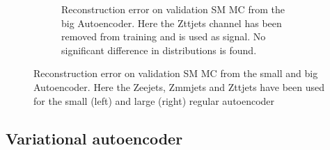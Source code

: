 \begin{figure}[H]
\begin{subfigure}{.45\textwidth}
        \caption{Reconstruction error on validation SM MC from the big Autoencoder. Here the Zttjets channel has been removed from training and 
        is used as signal. No significant difference in distributions is found. }
        \label{fig:ae_big_Zttjets}
    \end{subfigure}
    \hfill  
    \caption[AE | Channel removal, Zeejets, Zmmjets, Zttjets]{Reconstruction error on validation SM MC from the small and big Autoencoder. 
    Here the Zeejets, Zmmjets and Zttjets have been used for the small (left) and large (right) regular autoencoder}
    \label{fig:ae_big_channel5}
\end{figure}

\subsection*{Variational autoencoder}


